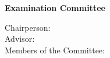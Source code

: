 \begin{titlepage}
\begin{center}
{\Large \textbf{Examination Committee}}\\[.25cm]
\begin{minipage}[t]{.5\textwidth}
  \begin{flushright}
    {\large Chairperson:\:}\\
    {\large Advisor:\:}\\
    {\large Members of the Committee:\:}
  \end{flushright}
\end{minipage}%
\begin{minipage}[t]{.5\textwidth}
  \begin{flushleft}
    {\Chairperson}\\
    {\Advisor}\\
    {\CommitteeMembers}
  \end{flushleft}
\end{minipage}\\[1.0cm]

{\Large \textbf{\Month\:\Year}}\\
\end{center}
\end{titlepage}
